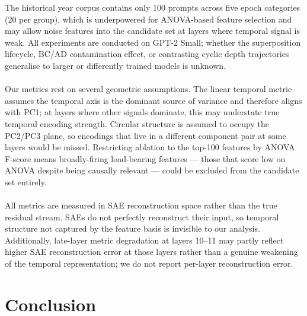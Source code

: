 \documentclass[11pt]{article}
\begin{document}
The historical year corpus contains only 100 prompts across five epoch categories (20 per group), which is underpowered for ANOVA-based
feature selection and may allow noise features into the candidate set at layers where temporal signal is weak. All experiments are conducted
on GPT-2 Small; whether the superposition lifecycle, BC/AD contamination effect, or contrasting cyclic depth trajectories generalise to
larger or differently trained models is unknown.
\\
\\
Our metrics rest on several geometric assumptions. The linear temporal metric assumes the temporal axis is the dominant source of variance
and therefore aligns with PC1; at layers where other signals dominate, this may understate true temporal encoding strength. Circular
structure is assumed to occupy the PC2/PC3 plane, so encodings that live in a different component pair at some layers would be missed.
Restricting ablation to the top-100 features by ANOVA F-score means broadly-firing load-bearing features --- those that score low on
ANOVA despite being causally relevant --- could be excluded from the candidate set entirely.
\\
\\
All metrics are measured in SAE reconstruction space rather than the true residual stream. SAEs do not perfectly reconstruct their input,
so temporal structure not captured by the feature basis is invisible to our analysis. Additionally, late-layer metric degradation at
layers 10--11 may partly reflect higher SAE reconstruction error at those layers rather than a genuine weakening of the temporal
representation; we do not report per-layer reconstruction error.

\section{Conclusion}
\end{document}
